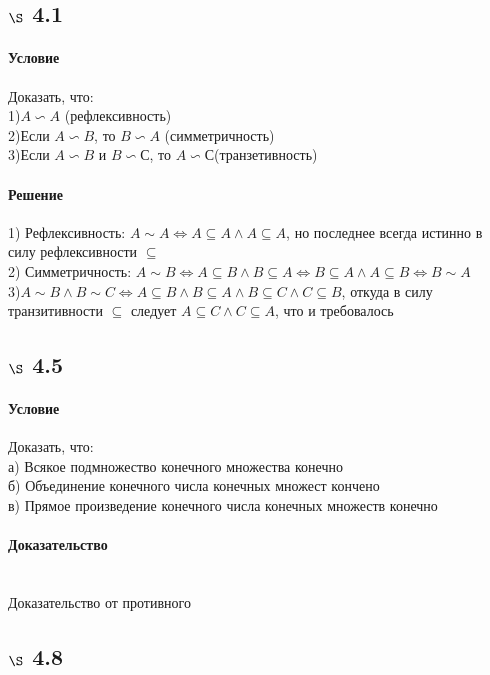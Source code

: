\documentclass[a4paper,12pt]{article}
\begin{document}
\subsection*{$\S$ 4.1}
\paragraph*{Условие}
Доказать, что:\\
1)$ A \backsim A $ (рефлексивность)\\
2)Если $ A \backsim B $, то $ B \backsim A $ (симметричность)\\
3)Если $ A \backsim B $ и $ B \backsim С $, то $ A \backsim С $(транзетивность)
\paragraph*{Решение\\}
1) Рефлексивность: $ A \sim A \Leftrightarrow A \subseteq A \wedge A \subseteq A$, но последнее всегда истинно в силу рефлексивности $\subseteq$\\ 
2) Симметричность: $A \sim B \Leftrightarrow A \subseteq B \wedge B \subseteq A \Leftrightarrow B \subseteq  A \wedge A \subseteq B \Leftrightarrow B \sim A$\\
3)$ A \sim B \wedge B \sim C \Leftrightarrow A \subseteq B \wedge B \subseteq A \wedge B \subseteq C \wedge C \subseteq B$, откуда в силу транзитивности $\subseteq$ следует $A \subseteq C \wedge C \subseteq A$, что и требовалось

\subsection*{$\S$ 4.5}
\paragraph*{Условие}
Доказать, что:\\
а) Всякое подмножество конечного множества конечно\\
б) Объединение конечного числа конечных множест кончено\\
в) Прямое произведение конечного числа конечных множеств конечно
\paragraph*{Доказательство}\mbox{}\\
Доказательство от противного

\subsection*{$\S$ 4.8}
\end{document}
